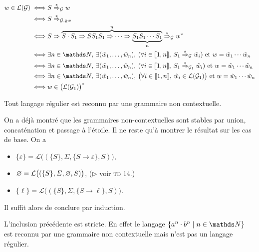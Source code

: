 \begin{prv}
\begin{enumerate}
			\begin{align*}
				w \in \mathcal{L}(\mathcal{G}) \iff& S \Rst_\mathcal{G} w \\
				\iff& S \Rst_{\mathcal{G},\mathrm{g} w} \\
				\iff& S \Rightarrow \overbrace{S \cdot S_1 \Rightarrow SS_1S_1 \Rightarrow \cdots \Rightarrow \underbrace{S_1S_1\cdots S_1}_n}^n \Rst_\mathcal{G} w^*\\
				\iff& \exists n \in \N,\: \exists(\tilde{w}_1, \ldots, \tilde{w}_n),\: (\forall i \in \llbracket 1,n \rrbracket,\: S_1 \Rst_\mathcal{G} \tilde{w}_i) \text{ et } w = \tilde{w}_1 \cdots \tilde{w}_n\\
				\iff& \exists n \in \N,\: \exists(\tilde{w}_1, \ldots, \tilde{w}_n),\: (\forall i \in \llbracket 1,n \rrbracket,\: S_1 \Rst_{\mathcal{G}_1} \tilde{w}_i) \text{ et } w = \tilde{w}_1 \cdots \tilde{w}_n\\
				\iff& \exists n \in \N,\: \exists(\tilde{w}_1, \ldots, \tilde{w}_n),\: \big(\forall i \in \llbracket 1,n \rrbracket,\: \tilde{w}_i \in \mathcal{L}(\mathcal{G}_1)\big) \text{ et } w = \tilde{w}_1 \cdots \tilde{w}_n\\
				\iff& w \in \big(\mathcal{L}(\mathcal{G}_1)\big)^* \\
			\end{align*}
	\end{enumerate}
\end{prv}

\begin{thm}
	Tout langage régulier est reconnu par une grammaire non contextuelle.
\end{thm}

\begin{prv}
	On a déjà montré que les grammaires non-contextuelles sont stables par union, concaténation et passage à l'étoile. Il ne reste qu'à montrer le résultat sur les cas de base.
	On a
	\begin{itemize}
		\item $\{\varepsilon\} = \mathcal{L}\big((\{S\}, \Sigma, \{S \to \varepsilon\}, S)\big)$,
		\item $\varnothing = \mathcal{L}\big((\{S\}, \varSigma, \varnothing, S)\big)$, ($\triangleright$ voir \textsc{td} 14.)
		\item $\{\ell\} = \mathcal{L}\big((\{S\} , \Sigma, \{S \to \ell\}, S)\big)$.
	\end{itemize}
	Il suffit alors de conclure par induction.
\end{prv}

\begin{rmk}
	L'inclusion précédente est stricte. En effet le langage $\{a^n \cdot  b^n  \mid n \in \N\}$  est reconnu par une grammaire non contextuelle mais n'est pas un langage régulier.
\end{rmk}

